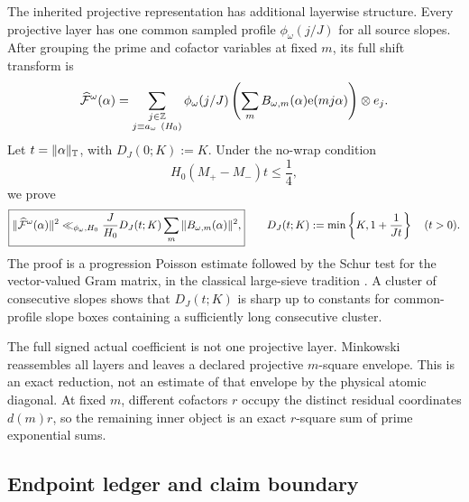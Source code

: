 The inherited projective representation has additional layerwise
structure.  Every projective layer has one common sampled profile
\(\phi_\omega(j/J)\) for all source slopes.  After grouping the prime
and cofactor variables at fixed \(m\), its full shift transform is
\begin{equation}
 \widehat{\mathcal F}^{\omega}(\alpha)
 =\sum_{\substack{j\in\mathbb Z\\j\equiv a_\omega\ (H_0)}}
 \phi_\omega(j/J)
 \left(\sum_m B_{\omega,m}(\alpha)\mathrm e(mj\alpha)\right)
 \otimes e_j.
 \label{eq:tpc48-intro-layer-normal-form}
\end{equation}
Let \(t=\|\alpha\|_\mathbb T\), with \(D_J(0;K):=K\).  Under the no-wrap
condition
\begin{equation}
 H_0(M_+-M_-)t\le\frac14,
 \label{eq:tpc48-intro-no-wrap}
\end{equation}
we prove
\begin{equation}
 \boxed{
 \|\widehat{\mathcal F}^{\omega}(\alpha)\|^2
 \ll_{\phi_\omega,H_0}
 \frac{J}{H_0}D_J(t;K)
 \sum_m\|B_{\omega,m}(\alpha)\|^2,}
 \qquad
 D_J(t;K):=\min\left\{K,1+\frac1{Jt}\right\}\quad(t>0).
 \label{eq:tpc48-intro-large-sieve}
\end{equation}
The proof is a progression Poisson estimate followed by the Schur test
for the vector-valued Gram matrix, in the classical large-sieve
tradition \citep{IwaniecKowalski2004}.  A cluster of consecutive slopes
shows that \(D_J(t;K)\) is sharp up to constants for common-profile
slope boxes containing a sufficiently long consecutive cluster.

The full signed actual coefficient is not one projective layer.
Minkowski reassembles all layers and leaves a declared projective
\(m\)-square envelope.  This is an exact reduction, not an estimate of
that envelope by the physical atomic diagonal.  At fixed \(m\),
different cofactors \(r\) occupy the distinct residual coordinates
\(d(m)r\), so the remaining inner object is an exact \(r\)-square sum
of prime exponential sums.

\subsection{Endpoint ledger and claim boundary}

